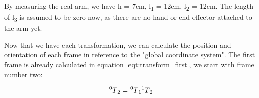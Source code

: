 \documentclass[conference]{IEEEtran}
\def\SP#1{\textsuperscript{\textcolor{black}{#1}}}
\def\SB#1{\textsubscript{\textcolor{black}{#1}}}
\begin{document}
  By measuring the real arm, we have h = 7cm, l\SB{1} = 12cm, l\SB{2} = 12cm. The length of l\SB{3} is assumed to be zero now, as there are no hand or end-effector attached to the arm yet.
  
  Now that we have each transformation, we can calculate the position and orientation of each frame in reference to the "global coordinate system". The first frame is already calculated in equation \ref{eqt:transform_first}, we start with frame number two:
  
  \begin{center}
  	\begin{equation} \label{eqt:frame_2_short}
  	\SP{0}T\SB{2} = \SP{0}T\SB{1} \SP{1}T\SB{2}
  	\end{equation}
  \end{center}
  
\end{document}
